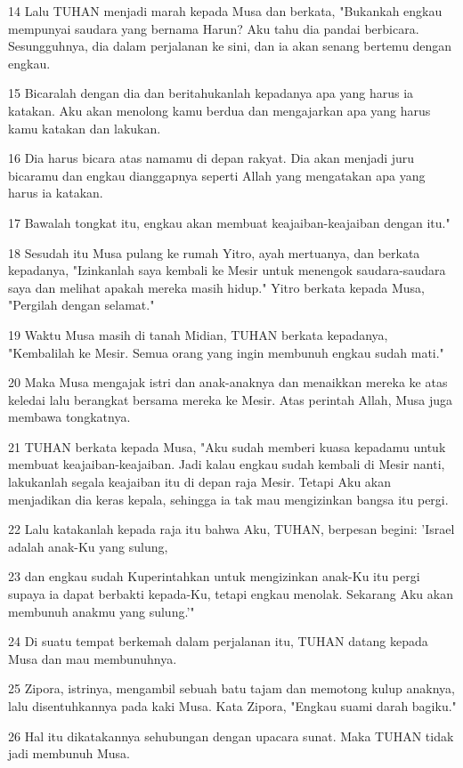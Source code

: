 \par 14 Lalu TUHAN menjadi marah kepada Musa dan berkata, "Bukankah engkau mempunyai saudara yang bernama Harun? Aku tahu dia pandai berbicara. Sesungguhnya, dia dalam perjalanan ke sini, dan ia akan senang bertemu dengan engkau.
\par 15 Bicaralah dengan dia dan beritahukanlah kepadanya apa yang harus ia katakan. Aku akan menolong kamu berdua dan mengajarkan apa yang harus kamu katakan dan lakukan.
\par 16 Dia harus bicara atas namamu di depan rakyat. Dia akan menjadi juru bicaramu dan engkau dianggapnya seperti Allah yang mengatakan apa yang harus ia katakan.
\par 17 Bawalah tongkat itu, engkau akan membuat keajaiban-keajaiban dengan itu."
\par 18 Sesudah itu Musa pulang ke rumah Yitro, ayah mertuanya, dan berkata kepadanya, "Izinkanlah saya kembali ke Mesir untuk menengok saudara-saudara saya dan melihat apakah mereka masih hidup." Yitro berkata kepada Musa, "Pergilah dengan selamat."
\par 19 Waktu Musa masih di tanah Midian, TUHAN berkata kepadanya, "Kembalilah ke Mesir. Semua orang yang ingin membunuh engkau sudah mati."
\par 20 Maka Musa mengajak istri dan anak-anaknya dan menaikkan mereka ke atas keledai lalu berangkat bersama mereka ke Mesir. Atas perintah Allah, Musa juga membawa tongkatnya.
\par 21 TUHAN berkata kepada Musa, "Aku sudah memberi kuasa kepadamu untuk membuat keajaiban-keajaiban. Jadi kalau engkau sudah kembali di Mesir nanti, lakukanlah segala keajaiban itu di depan raja Mesir. Tetapi Aku akan menjadikan dia keras kepala, sehingga ia tak mau mengizinkan bangsa itu pergi.
\par 22 Lalu katakanlah kepada raja itu bahwa Aku, TUHAN, berpesan begini: 'Israel adalah anak-Ku yang sulung,
\par 23 dan engkau sudah Kuperintahkan untuk mengizinkan anak-Ku itu pergi supaya ia dapat berbakti kepada-Ku, tetapi engkau menolak. Sekarang Aku akan membunuh anakmu yang sulung.'"
\par 24 Di suatu tempat berkemah dalam perjalanan itu, TUHAN datang kepada Musa dan mau membunuhnya.
\par 25 Zipora, istrinya, mengambil sebuah batu tajam dan memotong kulup anaknya, lalu disentuhkannya pada kaki Musa. Kata Zipora, "Engkau suami darah bagiku."
\par 26 Hal itu dikatakannya sehubungan dengan upacara sunat. Maka TUHAN tidak jadi membunuh Musa.
